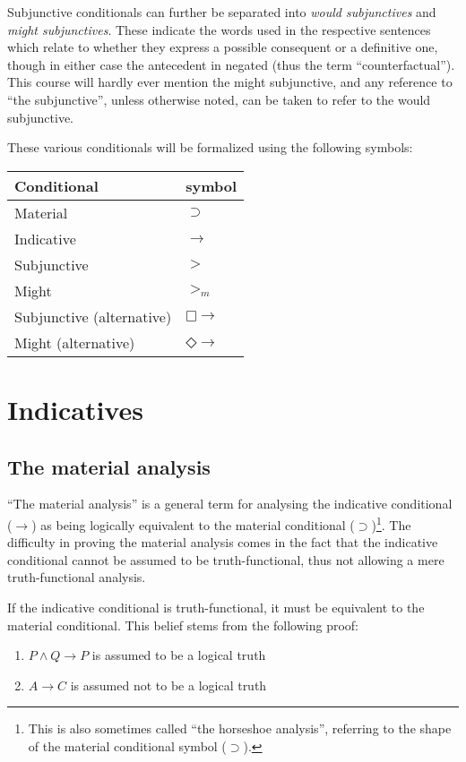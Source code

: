 \documentclass[12pt]{report}
\newcommand{\would}{{\mathbin{\Box}{\rightarrow}}}
\newcommand{\might}{{\mathbin{\Diamond}{\rightarrow}}}
\begin{document}
Subjunctive conditionals can further be separated into \emph{would subjunctives}
and \emph{might subjunctives}. These indicate the words used in the respective
sentences which relate to whether they express a possible consequent or a
definitive one, though in either case the antecedent in negated (thus the term
``counterfactual''). This course will hardly ever mention the might subjunctive,
and any reference to ``the subjunctive'', unless otherwise noted, can be taken
to refer to the would subjunctive.

These various conditionals will be formalized using the following symbols:
\begin{tabular}{l|l}
	Conditional & symbol\\
	\hline
	Material & $\supset$\\
	Indicative & $\rightarrow$\\
	Subjunctive & $>$\\
	Might & $>_m$\\
	Subjunctive (alternative) & $\would$\\
	Might (alternative) & $\might$\\
\end{tabular}

\part{Indicatives}
\chapter{The material analysis}

``The material analysis'' is a general term for analysing the indicative
conditional ($\rightarrow$) as being logically equivalent to the material
conditional ($\supset$)\footnote{This is also sometimes called ``the horseshoe
analysis'', referring to the shape of the material conditional symbol
($\supset$).}. The difficulty in proving the material analysis comes in the fact
that the indicative conditional cannot be assumed to be truth-functional, thus
not allowing a mere truth-functional analysis.

If the indicative conditional is truth-functional, it must be equivalent to the
material conditional. This belief stems from the following proof:
\begin{enumerate}
	\item
		$P \land Q \rightarrow P$ is assumed to be a logical truth 
	\item
		$A \rightarrow C$ is assumed not to be a logical truth
\end{enumerate}
\end{document}
